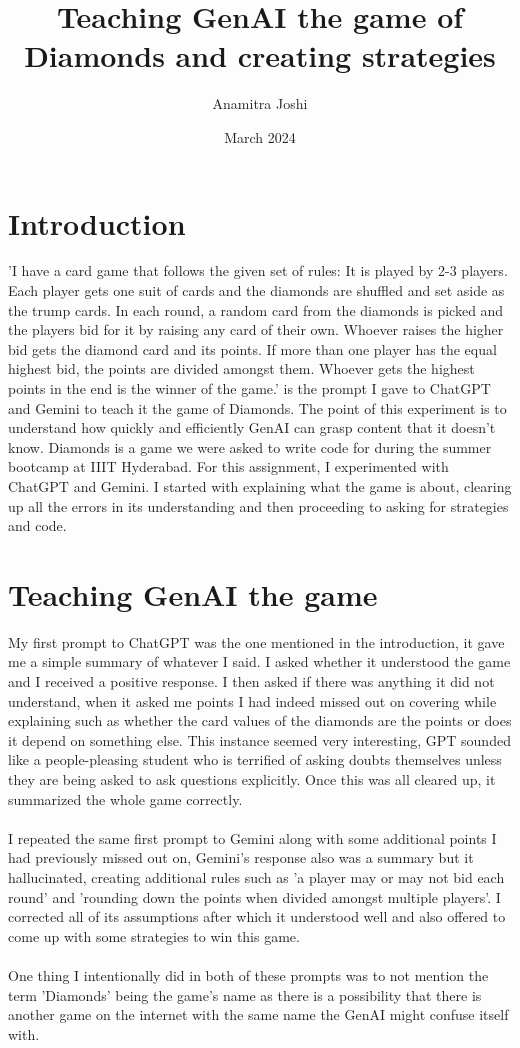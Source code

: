 \documentclass{article}
\title{Teaching GenAI the game of Diamonds and creating strategies}
\author{Anamitra Joshi}
\date{March 2024}
\begin{document}
\maketitle

\section{Introduction}
'I have a card game that follows the given set of rules:
It is played by 2-3 players. Each player gets one suit of cards and the diamonds are shuffled and set aside as the trump cards.
In each round, a random card from the diamonds is picked and the players bid for it by raising any card of their own. Whoever raises the higher bid gets the diamond card and its points.
If more than one player has the equal highest bid, the points are divided amongst them.
Whoever gets the highest points in the end is the winner of the game.' is the prompt I gave to ChatGPT and Gemini to teach it the game of Diamonds. The point of this experiment is to understand how quickly and efficiently GenAI can grasp content that it doesn't know. Diamonds is a game we were asked to write code for during the summer bootcamp at IIIT Hyderabad. For this assignment, I experimented with ChatGPT and Gemini. I started with explaining what the game is about, clearing up all the errors in its understanding and then proceeding to asking for strategies and code.

\section{Teaching GenAI the game}
My first prompt to ChatGPT was the one mentioned in the introduction, it gave me a simple summary of whatever I said. I asked whether it understood the game and I received a positive response. I then asked if there was anything it did not understand, when it asked me points I had indeed missed out on covering while explaining such as whether the card values of the diamonds are the points or does it depend on something else. This instance seemed very interesting, GPT sounded like a people-pleasing student who is terrified of asking doubts themselves unless they are being asked to ask questions explicitly. Once this was all cleared up, it summarized the whole game correctly.\\
\\
I repeated the same first prompt to Gemini along with some additional points I had previously missed out on, Gemini's response also was a summary but it hallucinated, creating additional rules such as 'a player may or may not bid each round' and 'rounding down the points when divided amongst multiple players'. I corrected all of its assumptions after which it understood well and also offered to come up with some strategies to win this game.\\ \\
One thing I intentionally did in both of these prompts was to not mention the term 'Diamonds' being the game's name as there is a possibility that there is another game on the internet with the same name the GenAI might confuse itself with.
\end{document}

